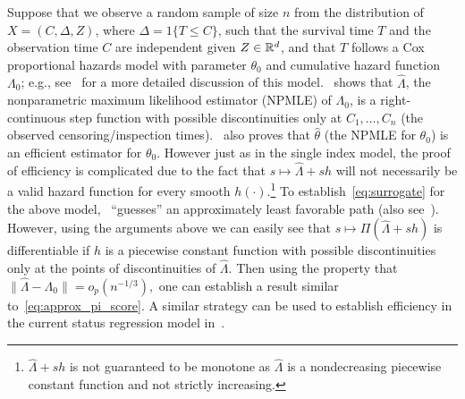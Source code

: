{\begin{example}\label{ex:coxmodel}
Suppose that we observe a random sample of size $n$ from the distribution of $X = (C, \Delta, Z)$, where $\Delta = 1\{T \le C\}$, such that the survival time $T$ and the  observation time $C$ are independent given $Z \in \mathbb{R}^d$, and that $T$ follows a Cox proportional hazards model with parameter $\theta_0$ and cumulative hazard function $\Lambda_0$; e.g., see~\cite[Section 2]{MR1394975} for a more detailed discussion of this model.~\citet{MR1394975} shows that $\hat\Lambda$, the nonparametric maximum likelihood estimator (NPMLE) of $\Lambda_0$, is a right-continuous step function with possible discontinuities only at $C_1,\ldots, C_n$ (the observed  censoring/inspection times).~\citet{MR1394975} also proves that $\hat{\theta}$ (the NPMLE for $\theta_0$) is an efficient estimator for $\theta_0$. However just as in the single index model, the proof of efficiency is complicated due to the fact that $s\mapsto \hat{\Lambda}+ s h$ will not necessarily be a valid hazard function for every smooth $h(\cdot)$.\footnote{$\hat{\Lambda}+ s h$ is not guaranteed to be monotone as $\hat{\Lambda}$  is a nondecreasing piecewise constant function and not strictly increasing.}  To establish~\eqref{eq:surrogate} for the above model,~\citet[pages 563-564]{MR1394975} ``guesses'' an approximately least favorable path (also see~\cite[pages 439-441]{VdV02}). However, using the arguments above we can easily see that $ s \mapsto \Pi(\hat{\Lambda}+ s h)$ is differentiable if $h$ is a piecewise constant function with possible discontinuities only at the points of discontinuities of $\hat{\Lambda}$. Then using the property that $\|\hat{\Lambda}-\Lambda_0\| =o_p(n^{-1/3}),$ one can establish a result similar to~\eqref{eq:approx_pi_score}. A similar strategy can be used to establish efficiency in the current status regression model in~\citet{VANC}.
 \end{example}



}
